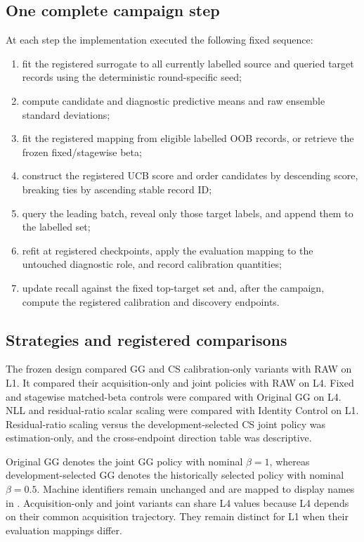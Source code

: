 \documentclass[10pt]{article}
\begin{document}
\subsection{One complete campaign step}
At each step the implementation executed the following fixed sequence:
\begin{enumerate}
\item fit the registered surrogate to all currently labelled source and queried
target records using the deterministic round-specific seed;
\item compute candidate and diagnostic predictive means and raw ensemble
standard deviations;
\item fit the registered mapping from eligible labelled OOB records, or retrieve
the frozen fixed/stagewise beta;
\item construct the registered UCB score and order candidates by descending
score, breaking ties by ascending stable record ID;
\item query the leading batch, reveal only those target labels, and append them
to the labelled set;
\item refit at registered checkpoints, apply the evaluation mapping to the
untouched diagnostic role, and record calibration quantities;
\item update recall against the fixed top-target set and, after the campaign,
compute the registered calibration and discovery endpoints.
\end{enumerate}




\subsection{Strategies and registered comparisons}
The frozen design compared GG and CS calibration-only variants with RAW on L1.
It compared their acquisition-only and joint policies with RAW on L4. Fixed
and stagewise matched-beta controls were compared with Original GG on L4. NLL
and residual-ratio scalar scaling were compared with Identity Control on L1.
Residual-ratio scaling versus the development-selected CS joint policy was
estimation-only, and the cross-endpoint direction table was descriptive.

Original GG denotes the joint GG policy with nominal $\beta=1$, whereas
development-selected GG denotes the historically selected policy with nominal
$\beta=0.5$. Machine identifiers remain unchanged and are mapped to display
names in . Acquisition-only and joint
variants can share L4 values because L4 depends on their common acquisition
trajectory. They remain distinct for L1 when their evaluation mappings differ.
\end{document}
